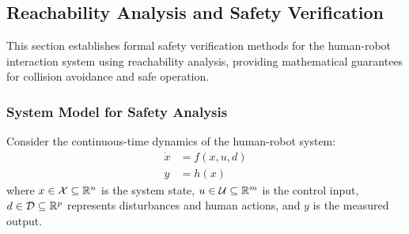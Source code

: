 \subsection{Reachability Analysis and Safety Verification}

This section establishes formal safety verification methods for the human-robot interaction system using reachability analysis, providing mathematical guarantees for collision avoidance and safe operation.

\subsubsection{System Model for Safety Analysis}

Consider the continuous-time dynamics of the human-robot system:
\begin{align}
\dot{x} &= f(x, u, d) \\
y &= h(x)
\end{align}
where $x \in \mathcal{X} \subseteq \mathbb{R}^n$ is the system state, $u \in \mathcal{U} \subseteq \mathbb{R}^m$ is the control input, $d \in \mathcal{D} \subseteq \mathbb{R}^p$ represents disturbances and human actions, and $y$ is the measured output.

